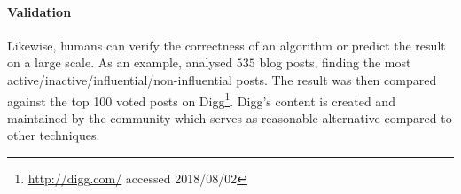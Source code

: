\paragraph{Validation} Likewise, humans can verify the correctness of an algorithm or predict the result on a large scale. As an example, \cite{agarwal2008} analysed $535$ blog posts, finding the most active/inactive/influential/non-influential posts. The result was then compared against the top 100 voted posts on Digg\footnote{\url{http://digg.com/} accessed 2018/08/02}. Digg's content is created and maintained by the community which serves as reasonable alternative compared to other techniques.  
